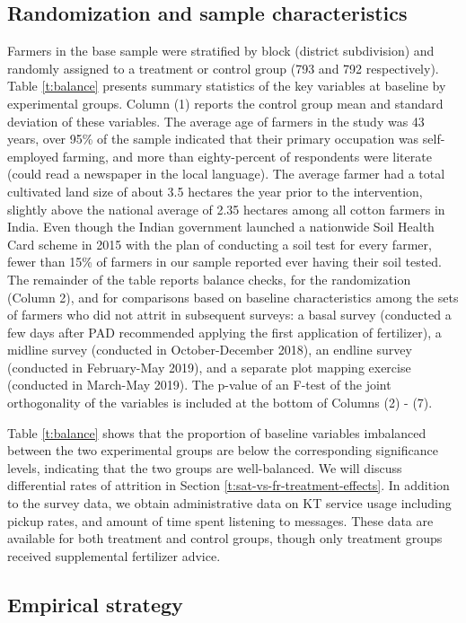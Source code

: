 \documentclass{article}
\begin{document}
\subsection{Randomization and sample characteristics}

Farmers in the base sample were stratified by block (district subdivision) and randomly assigned to a treatment or control group (793 and 792 respectively). Table \ref{t:balance} presents summary statistics of the key variables at baseline by experimental groups. Column (1) reports the control group mean and standard deviation of these variables. The average age of farmers in the study was 43 years, over 95\% of the sample indicated that their primary occupation was self-employed farming, and more than eighty-percent of respondents were literate (could read a newspaper in the local language). The average farmer had a total cultivated land size of about 3.5 hectares the year prior to the intervention, slightly above the national average of 2.35 hectares among all cotton farmers in India. Even though the Indian government launched a nationwide Soil Health Card scheme in 2015 with the plan of conducting a soil test for every farmer, fewer than 15\% of farmers in our sample reported ever having their soil tested. The remainder of the table reports balance checks, for the randomization (Column 2), and for comparisons based on baseline characteristics among the sets of farmers who did not attrit in subsequent surveys: a basal survey (conducted a few days after PAD recommended applying the first application of fertilizer), a midline survey (conducted in October-December 2018), an endline survey (conducted in February-May 2019), and a separate plot mapping exercise (conducted in March-May 2019). The p-value of an F-test of the joint orthogonality of the variables is included at the bottom of Columns (2) - (7). 

Table \ref{t:balance} shows that the proportion of baseline variables imbalanced between the two experimental groups are below the corresponding significance levels, indicating that the two groups are well-balanced. We will discuss differential rates of attrition in Section \ref{t:sat-vs-fr-treatment-effects}.  In addition to the survey data, we obtain administrative data on KT service usage including pickup rates, and amount of time spent listening to messages. These data are available for both treatment and control groups, though only treatment groups received supplemental fertilizer advice. 

\subsection{Empirical strategy}
\end{document}
